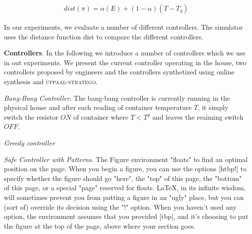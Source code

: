 \begin{equation}
    \begin{aligned}
        dist(\pi) = \alpha(E) + (1-\alpha)(T-T_g)
    \end{aligned}
\end{equation}

In our experiments, we evaluate a number of different controllers. The 
simulator uses the distance function dist to compare the different
controllers.

\textbf{Controllers}. In the following we introduce a number of controllers
which we use in out experiments. We present the current controller operating
in the house, two controllers proposed by engineers and the controllers 
synthetized using online synthesis and \textsc{uppaal-stratego}.

\emph{Bang-Bang Controller}. The bang-bang controller is currently running
in the physical house and after each reading of container temperature $T$,
it simply switch the resistor $ON$ of container where $T < T^g$ and leaves 
the reaiming switch $OFF$.

\emph{Greedy controller}


\emph{Safe Controller with Patterns}. 
The Figure environment "floats" to find an optimal position on the page. When you begin a figure, you can use the options [htbp!] to specify whether the figure should go "here", the "top" of this page, the "bottom" of this page, or a special "page" reserved for floats. LaTeX, in its infinite wisdom, will sometimes prevent you from putting a figure in an "ugly" place, but you can (sort of) override its decision using the "!" option. When you haven't used any option, the environment assumes that you provided [tbp], and it's choosing to put the figure at the top of the page, above where your section goes.

